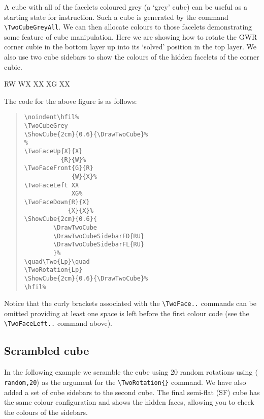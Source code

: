 \documentclass[a4paper]{article}
\begin{document}
A cube with all of the facelets coloured grey (a `grey' cube) can be 
useful as a starting state for instruction. Such a cube is generated 
by the command \verb!\TwoCubeGreyAll!.
We can then  allocate colours to those facelets demonstrating 
some feature of  cube manipulation. 
 Here we are showing how to rotate the GWR corner cubie in the bottom layer
 up into its `solved' position  in the top layer. We also use two cube 
 sidebars  to show the colours of the hidden facelets of the corner cubie.
  
  \bigskip
  

\noindent\hfil%
\TwoCubeGrey
{}%
%
          {R}{W}%
             {W}{X}%
\TwoFaceLeft XX
             XG%
            {X}{X}%
\quad{}%
\quad{}\quad
{}
%
\hfil%

\bigskip

{\noindent}The code for the above figure is as follows:
\begin{quote}
\begin{verbatim}
\noindent\hfil%
\TwoCubeGrey
\ShowCube{2cm}{0.6}{\DrawTwoCube}%
%
\TwoFaceUp{X}{X}
          {R}{W}%
\TwoFaceFront{G}{R}
             {W}{X}%
\TwoFaceLeft XX
             XG%
\TwoFaceDown{R}{X}
            {X}{X}%         
\ShowCube{2cm}{0.6}{
        \DrawTwoCube
        \DrawTwoCubeSidebarFD{RU}
        \DrawTwoCubeSidebarFL{RU}
        }%
\quad\Two{Lp}\quad
\TwoRotation{Lp}
\ShowCube{2cm}{0.6}{\DrawTwoCube}%
\hfil%
\end{verbatim}
\end{quote}
Notice that the curly brackets associated with the \verb!\TwoFace..! commands 
can be omitted providing at least one space is left before the first colour code 
(see the \verb!\TwoFaceLeft..! command above).

 
 \pagebreak
 
\subsection{Scrambled cube}

In the following example we scramble the cube using 20 random rotations using  
$\langle$\texttt{random,20}$\rangle$ as the argument 
for the \verb!\TwoRotation{}! command. We have also added a set of cube sidebars
to the second cube. The final semi-flat (SF) cube has the same colour configuration 
and shows the hidden faces, allowing you to check the colours of the sidebars.
 
\end{document}
